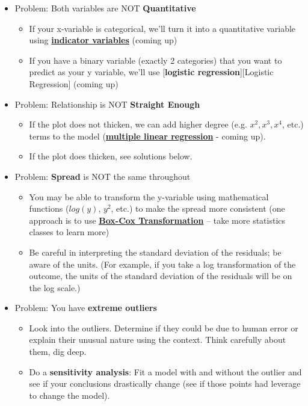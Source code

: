 \documentclass[]{book}
\providecommand{\tightlist}{%
  \setlength{\itemsep}{0pt}\setlength{\parskip}{0pt}}
\begin{document}
\begin{itemize}
\item
  Problem: Both variables are NOT \textbf{Quantitative}

  \begin{itemize}
  \tightlist
  \item
    If your x-variable is categorical, we'll turn it into a quantitative variable using \protect\hyperlink{indicator-variables}{\textbf{indicator variables}} (coming up)
  \item
    If you have a binary variable (exactly 2 categories) that you want to predict as your y variable, we'll use {[}\textbf{logistic regression}{]}{[}Logistic Regression{]} (coming up)
  \end{itemize}
\item
  Problem: Relationship is NOT \textbf{Straight Enough}

  \begin{itemize}
  \tightlist
  \item
    If the plot does not thicken, we can add higher degree (e.g. \(x^2, x^3, x^4\), etc.) terms to the model (\protect\hyperlink{multiple-linear-regression}{\textbf{multiple linear regression}} - coming up).
  \item
    If the plot does thicken, see solutions below.
  \end{itemize}
\item
  Problem: \textbf{Spread} is NOT the same throughout

  \begin{itemize}
  \tightlist
  \item
    You may be able to transform the y-variable using mathematical functions (\(log(y)\), \(y^2\), etc.) to make the spread more consistent (one approach is to use \href{https://en.wikipedia.org/wiki/Power_transform\#Box\%E2\%80\%93Cox_transformation}{\textbf{Box-Cox Transformation}} -- take more statistics classes to learn more)
  \item
    Be careful in interpreting the standard deviation of the residuals; be aware of the units. (For example, if you take a log transformation of the outcome, the units of the standard deviation of the residuals will be on the log scale.)
  \end{itemize}
\item
  Problem: You have \textbf{extreme outliers}

  \begin{itemize}
  \tightlist
  \item
    Look into the outliers. Determine if they could be due to human error or explain their unusual nature using the context. Think carefully about them, dig deep.
  \item
    Do a \textbf{sensitivity analysis}: Fit a model with and without the outlier and see if your conclusions drastically change (see if those points had leverage to change the model).
  \end{itemize}
\end{itemize}
\end{document}
